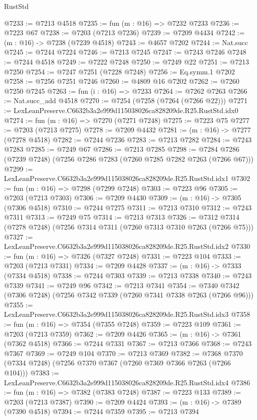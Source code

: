 \begin{lexlean}{RustStd}
\begin{coremodule}
@7233 := @7213 @4518
@7235 := fun (m : @16) => @7232 @7233
@7236 := @7223 @67
@7238 := @7203 (@7213 @7236)
@7239 := @7209 @4434
@7242 := (m : @16) -> @7238 (@7239 @4518)
@7243 := @4657 @7202
@7244 := Nat.succ
@7245 := @7244 @7224
@7246 := @7213 @7245
@7247 := @7243 @7246
@7248 := @7244 @4518
@7249 := @7222 @7248
@7250 := @7249 @22
@7251 := @7213 @7250
@7254 := @7247 @7251 (@7228 @7248)
@7256 := Eq.symm.{1} @7202
@7258 := @7256 @7251 @7246
@7260 := @4809 @16 @7202
@7262 := @7260 @7250 @7245
@7263 := fun (i : @16) => @7233
@7264 := @7262 @7263
@7266 := Nat.succ_add @4518
@7270 := @7254 (@7258 (@7264 (@7266 @22)))
@7271 := LexLeanPreserve.C6632b3a2e999d115038026ca828209de.R25.RustStd.idx0
@7274 := fun (m : @16) => @7270 (@7271 @7248)
@7275 := @7223 @75
@7277 := @7203 (@7213 @7275)
@7278 := @7209 @4432
@7281 := (m : @16) -> @7277 (@7278 @4518)
@7282 := @7244 @7236
@7283 := @7213 @7282
@7284 := @7243 @7283
@7285 := @7249 @67
@7286 := @7213 @7285
@7298 := @7284 @7286 (@7239 @7248) (@7256 @7286 @7283 (@7260 @7285 @7282 @7263 (@7266 @67)))
@7299 := LexLeanPreserve.C6632b3a2e999d115038026ca828209de.R25.RustStd.idx1
@7302 := fun (m : @16) => @7298 (@7299 @7248)
@7303 := @7223 @96
@7305 := @7203 (@7213 @7303)
@7306 := @7209 @4430
@7309 := (m : @16) -> @7305 (@7306 @4518)
@7310 := @7244 @7275
@7311 := @7213 @7310
@7312 := @7243 @7311
@7313 := @7249 @75
@7314 := @7213 @7313
@7326 := @7312 @7314 (@7278 @7248) (@7256 @7314 @7311 (@7260 @7313 @7310 @7263 (@7266 @75)))
@7327 := LexLeanPreserve.C6632b3a2e999d115038026ca828209de.R25.RustStd.idx2
@7330 := fun (m : @16) => @7326 (@7327 @7248)
@7331 := @7223 @104
@7333 := @7203 (@7213 @7331)
@7334 := @7209 @4428
@7337 := (m : @16) -> @7333 (@7334 @4518)
@7338 := @7244 @7303
@7339 := @7213 @7338
@7340 := @7243 @7339
@7341 := @7249 @96
@7342 := @7213 @7341
@7354 := @7340 @7342 (@7306 @7248) (@7256 @7342 @7339 (@7260 @7341 @7338 @7263 (@7266 @96)))
@7355 := LexLeanPreserve.C6632b3a2e999d115038026ca828209de.R25.RustStd.idx3
@7358 := fun (m : @16) => @7354 (@7355 @7248)
@7359 := @7223 @109
@7361 := @7203 (@7213 @7359)
@7362 := @7209 @4426
@7365 := (m : @16) -> @7361 (@7362 @4518)
@7366 := @7244 @7331
@7367 := @7213 @7366
@7368 := @7243 @7367
@7369 := @7249 @104
@7370 := @7213 @7369
@7382 := @7368 @7370 (@7334 @7248) (@7256 @7370 @7367 (@7260 @7369 @7366 @7263 (@7266 @104)))
@7383 := LexLeanPreserve.C6632b3a2e999d115038026ca828209de.R25.RustStd.idx4
@7386 := fun (m : @16) => @7382 (@7383 @7248)
@7387 := @7223 @133
@7389 := @7203 (@7213 @7387)
@7390 := @7209 @4424
@7393 := (m : @16) -> @7389 (@7390 @4518)
@7394 := @7244 @7359
@7395 := @7213 @7394

\end{coremodule}
\end{lexlean}
